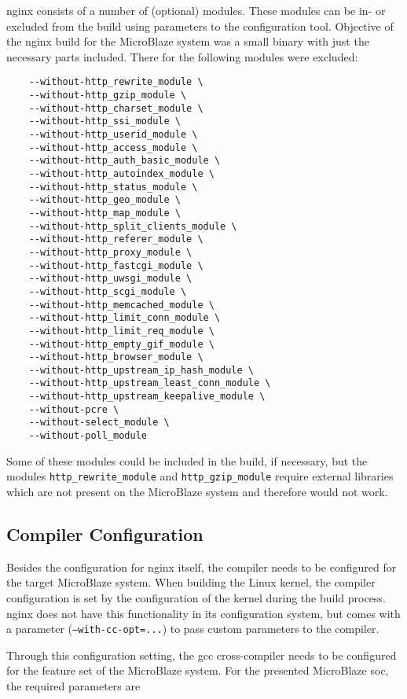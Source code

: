 nginx consists of a number of (optional) modules. These modules can be in- or excluded from the build using parameters to the configuration tool. Objective of the nginx build for the MicroBlaze system was a small binary with just the necessary parts included. There for the following modules were excluded:

\begin{verbatim}
    --without-http_rewrite_module \
    --without-http_gzip_module \
    --without-http_charset_module \
    --without-http_ssi_module \
    --without-http_userid_module \
    --without-http_access_module \
    --without-http_auth_basic_module \
    --without-http_autoindex_module \
    --without-http_status_module \
    --without-http_geo_module \
    --without-http_map_module \
    --without-http_split_clients_module \
    --without-http_referer_module \
    --without-http_proxy_module \
    --without-http_fastcgi_module \
    --without-http_uwsgi_module \
    --without-http_scgi_module \
    --without-http_memcached_module \
    --without-http_limit_conn_module \
    --without-http_limit_req_module \
    --without-http_empty_gif_module \
    --without-http_browser_module \
    --without-http_upstream_ip_hash_module \
    --without-http_upstream_least_conn_module \
    --without-http_upstream_keepalive_module \
    --without-pcre \
    --without-select_module \
    --without-poll_module
\end{verbatim}

Some of these modules could be included in the build, if necessary, but the modules \texttt{http\_rewrite\_module} and \texttt{http\_gzip\_module} require external libraries which are not present on the MicroBlaze system and therefore would not work.

\subsection{Compiler Configuration}

Besides the configuration for nginx itself, the compiler needs to be configured for the target MicroBlaze system. When building the Linux kernel, the compiler configuration is set by the configuration of the kernel during the build process. nginx does not have this functionality in its configuration system, but comes with a parameter (\texttt{--with-cc-opt=...}) to pass custom parameters to the compiler.

Through this configuration setting, the gcc cross-compiler needs to be configured for the feature set of the MicroBlaze system. For the presented MicroBlaze \gls{soc}, the required parameters are

